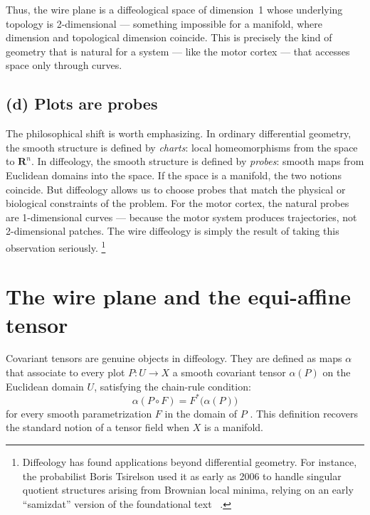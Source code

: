 \documentclass[10pt,letterpaper,reqno]{amsart}
\newcommand{\RR}{\mathbf{R}}
\begin{document}
  Thus, the wire plane is a diffeological space of dimension~1 whose underlying topology is 2-dimensional
  --- something impossible for a manifold, where dimension and topological dimension coincide.
  This is precisely the kind of geometry that is natural for a system
  --- like the motor cortex ---
  that accesses space only through curves.
  
  \subsection*{(d) Plots are probes}
  
  The philosophical shift is worth emphasizing.
  In ordinary differential geometry,
  the smooth structure is defined by \emph{charts}:
  local homeomorphisms from the space to $\RR^n$.
  In diffeology,
  the smooth structure is defined by \emph{probes}:
  smooth maps from Euclidean domains into the space.
  If the space is a manifold,
  the two notions coincide.
  But diffeology allows us to choose probes that match the physical or biological constraints of the problem.
  For the motor cortex,
  the natural probes are 1-dimensional curves
  --- because the motor system produces trajectories,
  not 2-dimensional patches.
  The wire diffeology is simply the result of taking this observation seriously.%
  \footnote{Diffeology has found applications beyond differential geometry.
  For instance, the probabilist Boris Tsirelson used it as early as 2006 to handle
  singular quotient structures arising from Brownian local minima, relying on an
  early ``samizdat'' version of the foundational text~\cite{PIZ13} \cite{Tsi06}.}
  
  \section{The wire plane and the equi-affine tensor}
  \label{sec:wire-plane}
  
  Covariant tensors are genuine objects in diffeology.
  They are defined as maps $\alpha$ that associate to every plot $P: U \to X$ a smooth covariant tensor $\alpha(P)$ on the Euclidean domain $U$, satisfying the chain-rule condition:
  \[
    \alpha(P \circ F) = F^*\big(\alpha(P)\big)
    \]
  for every smooth parametrization $F$ in the domain of $P$ \cite[§6.28 Note]{PIZ13}.
  This definition recovers the standard notion of a tensor field when $X$ is a manifold.
  
\end{document}
